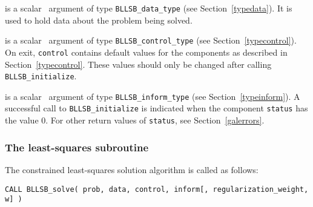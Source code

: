 \documentclass{galahad}
\newcommand{\packagename}{BLLSB}
\begin{document}
\vspace*{-3mm}
\begin{description}

 is a scalar \intentinout\ argument of type
{\tt \packagename\_data\_type}
(see Section~\ref{typedata}). It is used to hold data about the problem being
solved.

 is a scalar \intentout\ argument of type
{\tt \packagename\_control\_type}
(see Section~\ref{typecontrol}).
On exit, {\tt control} contains default values for the components as
described in Section~\ref{typecontrol}.
These values should only be changed after calling
{\tt \packagename\_initialize}.

 is a scalar \intentout\ argument of type
{\tt \packagename\_inform\_type}
(see Section~\ref{typeinform}). A successful call to
{\tt \packagename\_initialize}
is indicated when the  component {\tt status} has the value 0.
For other return values of {\tt status}, see Section~\ref{galerrors}.

\end{description}


\subsubsection{The least-squares subroutine}\label{qps}
The constrained least-squares solution algorithm is called as follows:
\vspace*{1mm}

\hspace{8mm}
{\tt CALL \packagename\_solve( prob, data, control, inform[, regularization\_weight, w] )}
\end{document}
